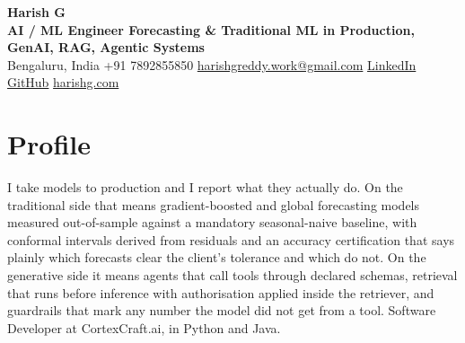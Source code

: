 \documentclass[10pt,a4paper]{article}
\begin{document}
{\LARGE\bfseries Harish G}\\[1pt]
{\small\bfseries AI / ML Engineer \textbar{} Forecasting \& Traditional ML in Production, GenAI, RAG, Agentic Systems}\\[2pt]
{\small Bengaluru, India \quad\textbar\quad +91 7892855850 \quad\textbar\quad
\href{mailto:harishgreddy.work@gmail.com}{harishgreddy.work@gmail.com} \quad\textbar\quad
\href{https://www.linkedin.com/in/harishgreddy/}{LinkedIn} \quad\textbar\quad \href{https://github.com/harish00506/}{GitHub} \quad\textbar\quad \href{https://www.harishg.com}{harishg.com}}

\section{Profile}
I take models to production and I report what they actually do. On the traditional side that means
gradient-boosted and global forecasting models measured out-of-sample against a mandatory
seasonal-naive baseline, with conformal intervals derived from residuals and an accuracy
certification that says plainly which forecasts clear the client's tolerance and which do not. On the
generative side it means agents that call tools through declared schemas, retrieval that runs before
inference with authorisation applied inside the retriever, and guardrails that mark any number the
model did not get from a tool. Software Developer at CortexCraft.ai, in Python and Java.

\end{document}
